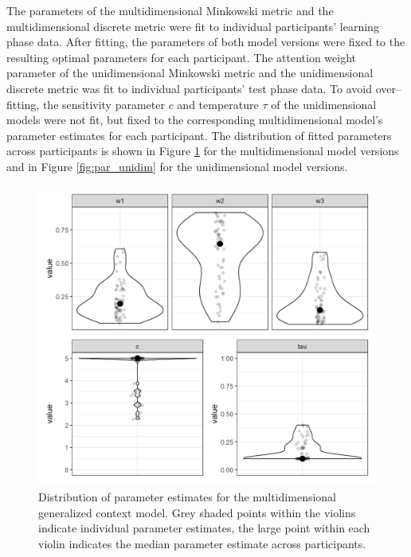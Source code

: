 \documentclass[a4paper,man,natbib]{apa6}
\begin{document}
The parameters of the multidimensional Minkowski metric and the multidimensional discrete metric were fit to individual participants’ learning phase data. After fitting, the parameters of both model versions were fixed to the resulting optimal parameters for each participant. The attention weight parameter of the unidimensional Minkowski metric and the unidimensional discrete metric was fit to individual participants’ test phase data. To avoid over--fitting, the sensitivity parameter $c$ and temperature $\tau$ of the unidimensional models were not fit, but fixed to the corresponding multidimensional model’s parameter estimates for each participant. The distribution of fitted parameters across participants is shown in Figure \ref{fig:par_multidim} for the multidimensional model versions and in Figure \ref{fig:par_unidim} for the unidimensional model versions. 

\begin{figure}
\centering
\includegraphics[width = \textwidth]{fig_par_multidim.png}
\caption{Distribution of parameter estimates for the multidimensional generalized context model. Grey shaded points within the violins indicate individual parameter estimates, the large point within each violin indicates the median parameter estimate across participants.}
\label{fig:par_multidim}
\end{figure}
\end{document}
